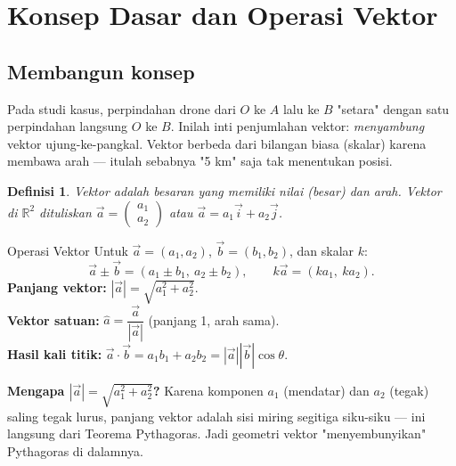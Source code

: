 \documentclass[11pt,a4paper]{report}
\theoremstyle{gaya}
\newtheorem{definisi}{Definisi}[chapter]
\begin{document}
\section{Konsep Dasar dan Operasi Vektor}

\subsection*{Membangun konsep}
Pada studi kasus, perpindahan drone dari $O$ ke $A$ lalu ke $B$ "setara" dengan satu perpindahan langsung $O$ ke $B$. Inilah inti penjumlahan vektor: \emph{menyambung} vektor ujung-ke-pangkal. Vektor berbeda dari bilangan biasa (skalar) karena membawa arah --- itulah sebabnya "5 km" saja tak menentukan posisi.

\begin{definisi}
\emph{Vektor} adalah besaran yang memiliki nilai (besar) dan arah. Vektor di $\mathbb{R}^2$ dituliskan $\vec{a} = \begin{pmatrix} a_1 \\ a_2 \end{pmatrix}$ atau $\vec{a} = a_1 \vec{i} + a_2 \vec{j}$.
\end{definisi}

\begin{center}
\end{center}

\begin{konsep}{Operasi Vektor}
Untuk $\vec{a}=(a_1,a_2)$, $\vec{b}=(b_1,b_2)$, dan skalar $k$:
\[
\vec{a}\pm\vec{b} = (a_1 \pm b_1,\ a_2 \pm b_2), \qquad
k\vec{a} = (k a_1,\ k a_2).
\]
\textbf{Panjang vektor:} $|\vec{a}| = \sqrt{a_1^2 + a_2^2}$.\\
\textbf{Vektor satuan:} $\hat{a}=\dfrac{\vec a}{|\vec a|}$ (panjang 1, arah sama).\\
\textbf{Hasil kali titik:} $\vec{a}\cdot\vec{b} = a_1 b_1 + a_2 b_2 = |\vec a||\vec b|\cos\theta$.
\end{konsep}

\textbf{Mengapa $|\vec a|=\sqrt{a_1^2+a_2^2}$?} Karena komponen $a_1$ (mendatar) dan $a_2$ (tegak) saling tegak lurus, panjang vektor adalah sisi miring segitiga siku-siku --- ini langsung dari Teorema Pythagoras. Jadi geometri vektor "menyembunyikan" Pythagoras di dalamnya.
\end{document}
